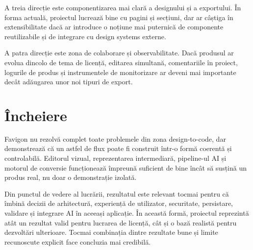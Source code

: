 A treia direcție este componentizarea mai clară a designului și a exportului. În forma actuală, proiectul lucrează bine cu pagini și secțiuni, dar ar câștiga în extensibilitate dacă ar introduce o noțiune mai puternică de componente reutilizabile și de integrare cu design systems externe.

A patra direcție este zona de colaborare și observabilitate. Dacă produsul ar evolua dincolo de tema de licență, editarea simultană, comentariile în proiect, logurile de produs și instrumentele de monitorizare ar deveni mai importante decât adăugarea unor noi tipuri de export.

\section{Încheiere}

Favigon nu rezolvă complet toate problemele din zona design-to-code, dar demonstrează că un astfel de flux poate fi construit într-o formă coerentă și controlabilă. Editorul vizual, reprezentarea intermediară, pipeline-ul AI și motorul de conversie funcționează împreună suficient de bine încât să susțină un produs real, nu doar o demonstrație izolată.

Din punctul de vedere al lucrării, rezultatul este relevant tocmai pentru că îmbină decizii de arhitectură, experiență de utilizator, securitate, persistare, validare și integrare AI în aceeași aplicație. În această formă, proiectul reprezintă atât un rezultat valid pentru lucrarea de licență, cât și o bază realistă pentru dezvoltări ulterioare. Tocmai combinația dintre rezultate bune și limite recunoscute explicit face concluzia mai credibilă.

